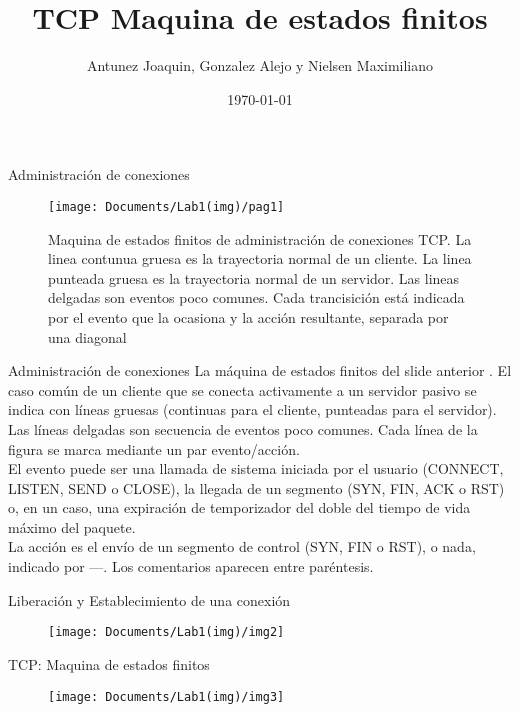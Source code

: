 \documentclass[12pt]{beamer}
\title{TCP Maquina de estados finitos}
\author{Antunez Joaquin, Gonzalez Alejo y Nielsen Maximiliano}
\date{\today}
\begin{document}
\begin{frame}
\titlepage
\end{frame}
\begin{frame}{Administración de conexiones}
\begin{figure}
	\centering
	\texttt{[image: Documents/Lab1(img)/pag1]}
	\label{fig:fig1}

	\tiny Maquina de estados finitos de administración de conexiones TCP. La linea contunua
	gruesa es la trayectoria normal de un cliente. La linea punteada gruesa es la trayectoria normal de
	un servidor. Las lineas delgadas son eventos poco comunes. Cada trancisición está indicada por el 
	evento que la ocasiona y la acción resultante, separada por una diagonal
\end{figure}
\tableofcontents
\end{frame}
\begin{frame}{Administración de conexiones}
\small	La máquina de estados finitos del slide anterior . El caso común de un cliente que
	se conecta activamente a un servidor pasivo se indica con líneas gruesas
	(continuas para el cliente, punteadas para el servidor). Las líneas delgadas son
	secuencia de eventos poco comunes. Cada línea de la figura se marca mediante
	un par evento/acción.\\
	\vspace{7mm}	
	El evento puede ser una llamada de sistema iniciada por el usuario (CONNECT,
	LISTEN, SEND o CLOSE), la llegada de un segmento (SYN, FIN, ACK o RST) o,
	en un caso, una expiración de temporizador del doble del tiempo de vida máximo
	del paquete.\\
	\vspace{7mm}	
	La acción es el envío de un segmento de control (SYN, FIN
	o RST), o nada, indicado por —. Los comentarios aparecen entre paréntesis.
\end{frame}
\begin{frame}{Liberación y Establecimiento de una conexión}	
\begin{figure}
	\centering
	\texttt{[image: Documents/Lab1(img)/img2]}
	\label{fig:img2}
\end{figure}
\end{frame}
\begin{frame}{TCP: Maquina de estados finitos}	
	\begin{figure}
		\centering
		\texttt{[image: Documents/Lab1(img)/img3]}
		\label{fig:img3}
	\end{figure}
\end{frame}
\end{document}
